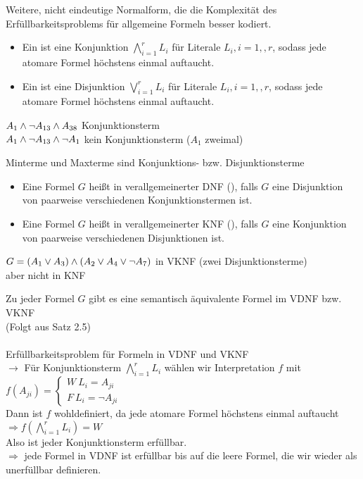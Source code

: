 

Weitere, nicht eindeutige Normalform, die die Komplexität des Erfüllbarkeitsproblems für allgemeine Formeln besser kodiert. 

\begin{itemize}
\item Ein  ist eine Konjunktion $\bigwedge_{i = 1}^r L_i$ für Literale $L_i, i=1, , r$, sodass jede atomare Formel höchstens einmal auftaucht.
\item Ein  ist eine Disjunktion $\bigvee_{i=1}^r L_i$ für Literale $L_i, i=1, , r$, sodass jede atomare Formel höchstens einmal auftaucht.
\end{itemize}

\beispiel{}
$A_1 \wedge \neg A_{13} \wedge A_{38}$ Konjunktionsterm\\
$A_1 \wedge \neg A_{13} \wedge \neg A_1$ kein Konjunktionsterm ($A_1$ zweimal)

\bemerkung{}
Minterme und Maxterme sind Konjunktions- bzw. Disjunktionsterme

\begin{itemize}
\item Eine Formel $G$ heißt in verallgemeinerter DNF (), falls $G$ eine Disjunktion von paarweise verschiedenen Konjunktionstermen ist.
\item Eine Formel $G$ heißt in verallgemeinerter KNF (), falls $G$ eine Konjunktion von paarweise verschiedenen Disjunktionen ist.
\end{itemize}

\beispiel{}
$G = (A_1 \vee A_3) \wedge (A_2 \vee A_4 \vee \neg A_7)$ in VKNF (zwei Disjunktionsterme)\\
aber nicht in KNF

\bemerkung{}
Zu jeder Formel $G$ gibt es eine semantisch äquivalente Formel im VDNF bzw. VKNF\\
(Folgt aus Satz 2.5)\\

\noindent\\
Erfüllbarkeitsproblem für Formeln in VDNF und VKNF\\
$\rightarrow$ Für Konjunktionsterm $\bigwedge_{i=1}^r L_i$ wählen wir Interpretation $f$ mit $f(A_{ji}) = \begin{cases} W\ L_i = A_{ji} \\ F\ L_i = \neg A_{ji} \end{cases}$\\
Dann ist $f$ wohldefiniert, da jede atomare Formel höchstens einmal auftaucht \\
$\Rightarrow f(\bigwedge_{i=1}^r L_i) = W$\\
Also ist jeder Konjunktionsterm erfüllbar.\\
$\Rightarrow$ jede Formel in VDNF ist erfüllbar bis auf die leere Formel, die wir wieder als unerfüllbar definieren.\\

